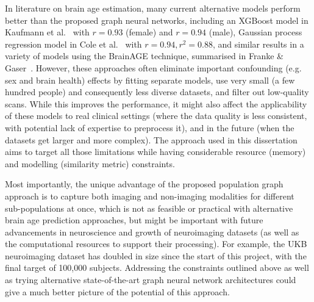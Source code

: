 In literature on brain age estimation, many current alternative models perform better than the proposed graph neural networks, including an XGBoost model in Kaufmann et al.~\cite{kaufmann2019} with $r=0.93$ (female) and $r=0.94$ (male), Gaussian process regression model in Cole et al.~\cite{cole2018brain} with $r=0.94, r^2=0.88$, and similar results in a variety of models using the BrainAGE technique, summarised in Franke \& Gaser~\cite{franke2019ten}. However, these approaches often eliminate important confounding (e.g. sex and brain health) effects by fitting separate models, use very small (a few hundred people) and consequently less diverse datasets, and filter out low-quality scans. While this improves the performance, it might also affect the applicability of these models to real clinical settings (where the data quality is less consistent, with potential lack of expertise to preprocess it), and in the future (when the datasets get larger and more complex). The approach used in this dissertation aims to target all those limitations while having considerable resource (memory) and modelling (similarity metric) constraints. 

Most importantly, the unique advantage of the proposed population graph approach is to capture both imaging and non-imaging modalities for different sub-populations at once, which is not as feasible or practical with alternative brain age prediction approaches, but might be important with future advancements in neuroscience and growth of neuroimaging datasets (as well as the computational resources to support their processing). For example, the UKB neuroimaging dataset has doubled in size since the start of this project, with the final target of 100,000 subjects. Addressing the constraints outlined above as well as trying alternative state-of-the-art graph neural network architectures could give a much better picture of the potential of this approach.


